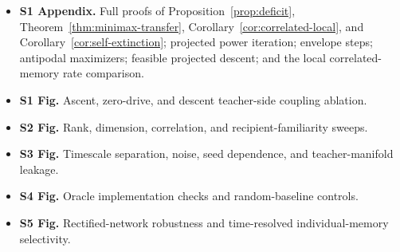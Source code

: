 \documentclass[10pt,letterpaper]{article}
\theoremstyle{plain}
\theoremstyle{remark}
\begin{document}
\begin{itemize}
\item \textbf{S1 Appendix.} Full proofs of Proposition~\ref{prop:deficit}, Theorem~\ref{thm:minimax-transfer}, Corollary~\ref{cor:correlated-local}, and Corollary~\ref{cor:self-extinction}; projected power iteration; envelope steps; antipodal maximizers; feasible projected descent; and the local correlated-memory rate comparison.
\item \textbf{S1 Fig.} Ascent, zero-drive, and descent teacher-side coupling ablation.
\item \textbf{S2 Fig.} Rank, dimension, correlation, and recipient-familiarity sweeps.
\item \textbf{S3 Fig.} Timescale separation, noise, seed dependence, and teacher-manifold leakage.
\item \textbf{S4 Fig.} Oracle implementation checks and random-baseline controls.
\item \textbf{S5 Fig.} Rectified-network robustness and time-resolved individual-memory selectivity.
\end{itemize}



\end{document}

